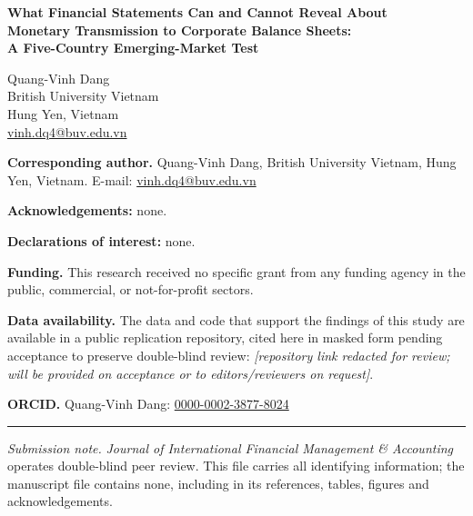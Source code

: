 \documentclass[12pt]{article}
\begin{document}
\thispagestyle{empty}

\begin{center}
{\Large\bfseries What Financial Statements Can and Cannot Reveal About\\[0.3em]
Monetary Transmission to Corporate Balance Sheets:\\[0.3em]
A Five-Country Emerging-Market Test}
\end{center}

\vspace{2em}

\begin{center}
{\large Quang-Vinh Dang}\\[0.6em]
British University Vietnam\\
Hung Yen, Vietnam\\[0.4em]
\href{mailto:vinh.dq4@buv.edu.vn}{vinh.dq4@buv.edu.vn}
\end{center}

\vspace{2em}

\noindent\textbf{Corresponding author.} Quang-Vinh Dang, British University
Vietnam, Hung Yen, Vietnam. E-mail:
\href{mailto:vinh.dq4@buv.edu.vn}{vinh.dq4@buv.edu.vn}

\vspace{1em}
\noindent\textbf{Acknowledgements:} none.

\vspace{1em}
\noindent\textbf{Declarations of interest:} none.

\vspace{1em}
\noindent\textbf{Funding.} This research received no specific grant from any
funding agency in the public, commercial, or not-for-profit sectors.

\vspace{1em}
\noindent\textbf{Data availability.} The data and code that support the
findings of this study are available in a public replication repository,
cited here in masked form pending acceptance to preserve double-blind review:
\emph{[repository link redacted for review; will be provided on acceptance or
to editors/reviewers on request]}.

\vspace{1em}
\noindent\textbf{ORCID.} Quang-Vinh Dang:
\href{https://orcid.org/0000-0002-3877-8024}{0000-0002-3877-8024}

\vspace{2em}
\hrule
\vspace{1em}

\noindent\textit{Submission note.} \emph{Journal of International Financial
Management \& Accounting} operates double-blind peer review. This file
carries all identifying information; the manuscript file contains none,
including in its references, tables, figures and acknowledgements.
\end{document}
